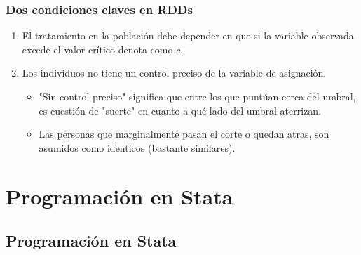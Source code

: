 \documentclass[10pt, aspectratio=169, compress]{beamer}
\begin{document}
\begin{frame}
	\frametitle{Dos condiciones claves en RDDs}

	\begin{enumerate}
		\item El tratamiento en la población debe depender en que si la variable observada excede el valor crítico denota como $c$.
		\item Los individuos no tiene un control preciso de la variable de asignación.
		\begin{itemize}
			\item "Sin control preciso" significa que entre los que puntúan cerca del umbral, es cuestión de "suerte" en cuanto a qué lado del umbral aterrizan.
			\item Las personas que marginalmente pasan el corte o quedan atras, son asumidos como identicos (bastante similares).
		\end{itemize}
	\end{enumerate}

\end{frame}

\section{Programación en Stata}
\subsection{Programación en Stata}
\end{document}
